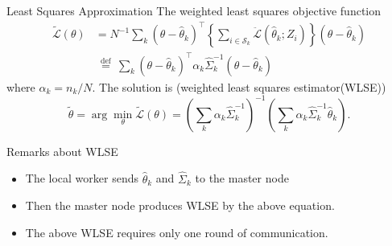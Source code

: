 \documentclass[11pt]{beamer}
\begin{document}
\begin{frame}{Least Squares Approximation}
The weighted least squares objective function
$$
\begin{aligned}
\widetilde{\mathcal{L}}(\theta) &=N^{-1} \sum_{k}\left(\theta-\widehat{\theta}_{k}\right)^{\top}\left\{\sum_{i \in \mathcal{S}_{k}} \ddot{\mathcal{L}}\left(\widehat{\theta}_{k} ; Z_{i}\right)\right\}\left(\theta-\widehat{\theta}_{k}\right) \\
& \stackrel{\text { def }}{=} \sum_{k}\left(\theta-\widehat{\theta}_{k}\right)^{\top} \alpha_{k} \widehat{\Sigma}_{k}^{-1}\left(\theta-\widehat{\theta}_{k}\right)
\end{aligned}
$$
where $\alpha_k=n_k/N$.  
The solution is (weighted least squares estimator(WLSE))
$$
\widetilde{\theta}=\arg \min _{\theta} \widetilde{\mathcal{L}}(\theta)=\left(\sum_{k} \alpha_{k} \widehat{\Sigma}_{k}^{-1}\right)^{-1}\left(\sum_{k} \alpha_{k} \widehat{\Sigma}_{k}^{-1} \widehat{\theta}_{k}\right).
$$
\end{frame}

\begin{frame}{Remarks about WLSE}
\begin{itemize}
\item The local worker sends $\hat{\theta}_k$ and $\hat{\Sigma}_k$  to the master node

\vspace{2ex}

\item Then the master node produces WLSE by the above equation.

\vspace{2ex}

\item The above WLSE requires only one round of communication.
\end{itemize}
\end{frame}
\end{document}
